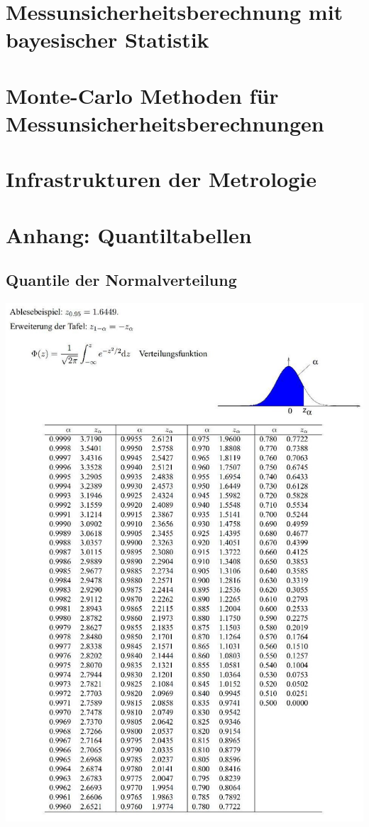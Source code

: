 \documentclass[a4paper,11pt]{book}
\begin{document}
\chapter{Messunsicherheitsberechnung mit bayesischer Statistik}
\label{bayesMU}


\chapter{Monte-Carlo Methoden für Messunsicherheitsberechnungen}
\label{montecarloMU}


\chapter{Infrastrukturen der Metrologie}


\chapter{Anhang: Quantiltabellen}
\label{quantiltabellen}
\section{Quantile der Normalverteilung}
\begin{center}
 \includegraphics[width=150mm]{08_vorlesung/media/NV_Quantile.jpg}
\end{center}

\end{document}

